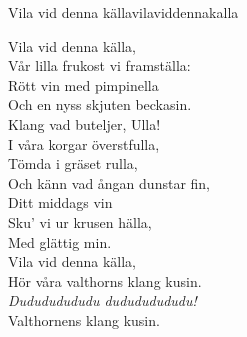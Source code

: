 \begin{song}{Vila vid denna källa}{vilaviddennakalla}
\begin{vers}
    Vila vid denna källa,\\
    Vår lilla frukost vi framställa:\\
    Rött vin med pimpinella\\
    Och en nyss skjuten beckasin.\\
    Klang vad buteljer, Ulla!\\
    I våra korgar överstfulla,\\
    Tömda i gräset rulla,\\
    Och känn vad ångan dunstar fin,\\
    Ditt middags vin\\
    Sku' vi ur krusen hälla,\\
    Med glättig min.\\
    Vila vid denna källa,\\
    Hör våra valthorns klang kusin.\\
    \textit{Dudududududu dudududududu!}\\
    Valthornens klang kusin.\\
\end{vers}
\end{song}